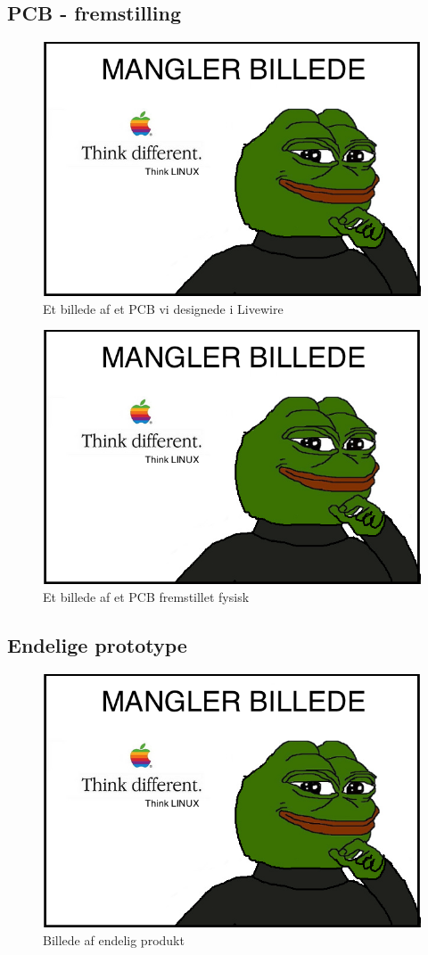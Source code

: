 \subsection{PCB - fremstilling}
	\begin{figure}[H]
		\centering
	    \includegraphics[width=13cm]{figures/stock.jpg}
		\caption{Et billede af et PCB vi designede i Livewire}
		\label{fig:PCBPrint}
	\end{figure}
	\begin{figure}[H]
		\centering
	    \includegraphics[width=13cm]{figures/stock.jpg}
		\caption{Et billede af et PCB fremstillet fysisk}
		\label{fig:PCBfysisk}
	\end{figure}
\subsection{Endelige prototype}
\begin{figure}[H]
	\centering
    \includegraphics[width=13cm]{figures/stock.jpg}
	\caption{Billede af endelig produkt}
	\label{fig:endeligPrototype}
\end{figure}

